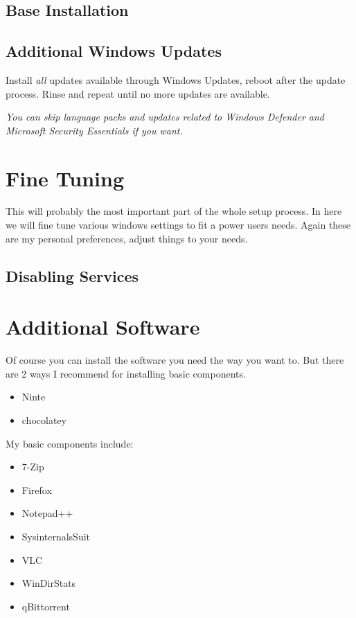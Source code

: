 \documentclass{itsarticle}
\begin{document}
\subsection{Base Installation}
\label{ssec:base_install}

\subsection{Additional Windows Updates}
\label{ssec:updates_post_install}

Install \emph{all} updates available through Windows Updates, reboot after the
update process. Rinse and repeat until no more updates are available.

\textit{You can skip language packs and updates related to Windows Defender and
Microsoft Security Essentials if you want.}

\section{Fine Tuning}
\label{sec:fine_tuning}

This will probably the most important part of the whole setup process. In here
we will fine tune various windows settings to fit a power users needs. Again
these are my personal preferences, adjust things to your needs.

\subsection{Disabling Services}
\label{ssec:services}

\section{Additional Software}
\label{sec:software}

Of course you can install the software you need the way you want to. But there
are 2 ways I recommend for installing basic components.

\begin{itemize}
    \item Ninte\footnotemark
    \item chocolatey\footnotemark
\end{itemize}


My basic components include:

\begin{itemize}
    \item 7-Zip
    \item Firefox
    \item Notepad++
    \item SysinternalsSuit
    \item VLC
    \item WinDirStats
    \item qBittorrent
\end{itemize}
\end{document}
